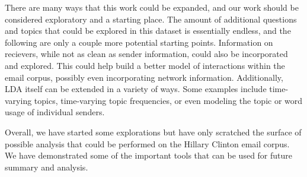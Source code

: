 \documentclass[12pt]{article}
\theoremstyle{definition}
\theoremstyle{algodesc}
\begin{document}
There are many ways that this work could be expanded, and our work should be considered exploratory and a starting place. The amount of additional questions and topics that could be explored in this dataset is essentially endless, and the following are only a couple more potential starting points. Information on recievers, while not as clean as sender information, could also be incorporated and explored. This could help build a better model of interactions within the email corpus, possibly even incorporating network information. Additionally, LDA itself can be extended in a variety of ways. Some examples include time-varying topics, time-varying topic frequencies, or even modeling the topic or word usage of individual senders.

Overall, we have started some explorations but have only scratched the surface of possible analysis that could be performed on the Hillary Clinton email corpus. We have demonstrated some of the important tools that can be used for future summary and analysis.




\end{document}
